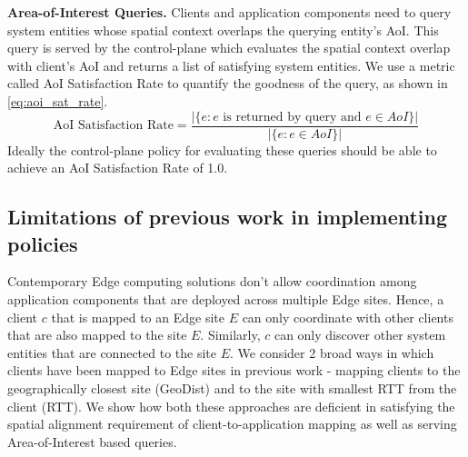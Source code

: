 \par \textbf{Area-of-Interest Queries. } Clients and application components need to query system entities whose spatial context overlaps the querying entity's AoI. This query is served by the control-plane which evaluates the spatial context overlap with client's AoI and returns a list of satisfying system entities. We use a metric called AoI Satisfaction Rate to quantify the goodness of the query, as shown in \cref{eq:aoi_sat_rate}.
\begin{equation}
\text{AoI Satisfaction Rate} = \dfrac{|\{ e: e \text{ is returned by query  and } e \in AoI \}|}{|\{ e: e \in AoI \}|}
\label{eq:aoi_sat_rate}
\end{equation}
Ideally the control-plane policy for evaluating these queries should be able to achieve an AoI Satisfaction Rate of 1.0.
\subsection{Limitations of previous work in implementing policies}
Contemporary Edge computing solutions don't allow coordination among application components that are deployed across multiple Edge sites. Hence, a client $c$ that is mapped to an Edge site $E$ can only coordinate with other clients that are also mapped to the site $E$. Similarly, $c$ can only discover other system entities that are connected to the site $E$. We consider 2 broad ways in which clients have been mapped to Edge sites in previous work - mapping clients to the geographically closest site (GeoDist) and to the site with smallest RTT from the client (RTT). We show how both these approaches are deficient in satisfying the spatial alignment requirement of client-to-application mapping as well as serving Area-of-Interest based queries.

